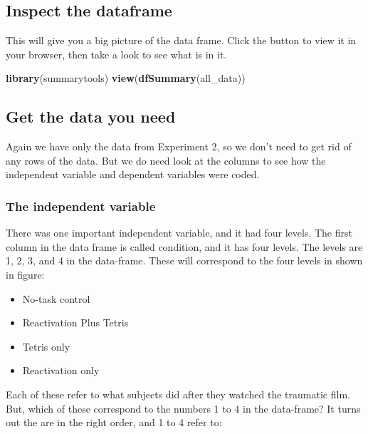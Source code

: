 \documentclass[]{book}
\newenvironment{Shaded}{\begin{snugshade}}{\end{snugshade}}
\newcommand{\KeywordTok}[1]{\textcolor[rgb]{0.13,0.29,0.53}{\textbf{#1}}}
\newcommand{\NormalTok}[1]{#1}
\providecommand{\tightlist}{%
  \setlength{\itemsep}{0pt}\setlength{\parskip}{0pt}}
\begin{document}
\subsection{Inspect the dataframe}\label{inspect-the-dataframe}

This will give you a big picture of the data frame. Click the button to
view it in your browser, then take a look to see what is in it.

\begin{Shaded}
\begin{Highlighting}[]
\KeywordTok{library}\NormalTok{(summarytools)}
\KeywordTok{view}\NormalTok{(}\KeywordTok{dfSummary}\NormalTok{(all_data))}
\end{Highlighting}
\end{Shaded}

\subsection{Get the data you need}\label{get-the-data-you-need}

Again we have only the data from Experiment 2, so we don't need to get
rid of any rows of the data. But we do need look at the columns to see
how the independent variable and dependent variables were coded.

\subsubsection{The independent variable}\label{the-independent-variable}

There was one important independent variable, and it had four levels.
The first column in the data frame is called condition, and it has four
levels. The levels are 1, 2, 3, and 4 in the data-frame. These will
correspond to the four levels in shown in figure:

\begin{itemize}
\tightlist
\item
  No-task control
\item
  Reactivation Plus Tetris
\item
  Tetris only
\item
  Reactivation only
\end{itemize}

Each of these refer to what subjects did after they watched the
traumatic film. But, which of these correspond to the numbers 1 to 4 in
the data-frame? It turns out the are in the right order, and 1 to 4
refer to:
\end{document}
